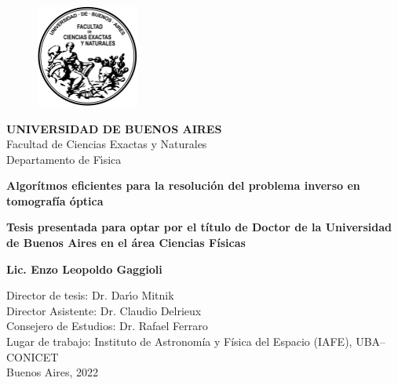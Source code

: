 

\begin{titlepage}
\begin{center}

\begin{figure}[htb]
\center
\includegraphics[width=0.3\textwidth]{figuras/Logo-fcenuba}
\end{figure}
{\bf UNIVERSIDAD DE BUENOS AIRES}\\
Facultad de Ciencias Exactas y Naturales\\
Departamento de F\'{\i}sica

\vspace*{0.5cm}
\begin{Large}
\textbf{Algorítmos eficientes para la resolución 
del problema inverso en tomografía óptica} \\
\end{Large}
\vspace*{0.5cm}
\textbf{Tesis presentada para optar por el título de Doctor de la Universidad de 
Buenos Aires en el área Ciencias Físicas}\\

\begin{large}
\textbf{Lic. Enzo Leopoldo Gaggioli}\\
\end{large}

\vspace*{1.0cm}
\begin{flushleft}
Director de tesis: Dr. Dar\'{\i}o Mitnik\\
Director Asistente: Dr. Claudio Delrieux\\
Consejero de Estudios: Dr. Rafael Ferraro\\
\vspace*{0.5cm}
Lugar de trabajo: Instituto de Astronomía y Física del Espacio (IAFE), UBA--CONICET\\
\vspace*{0.5cm}
Buenos Aires, 2022
\end{flushleft}



\end{center}

\end{titlepage}

